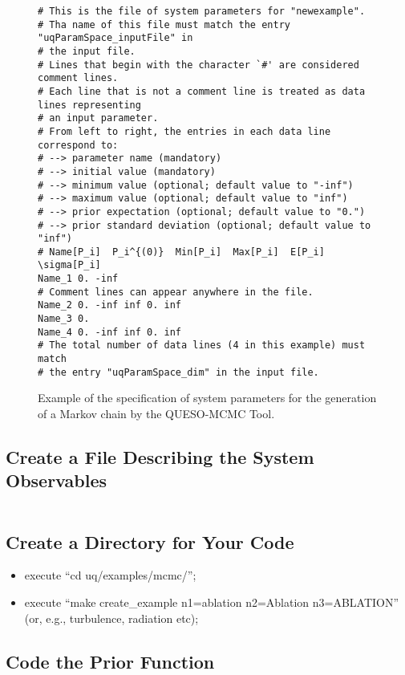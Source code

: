 \begin{figure}[h!]
\begin{verbatim}
# This is the file of system parameters for "newexample".
# Tha name of this file must match the entry "uqParamSpace_inputFile" in
# the input file.
# Lines that begin with the character `#' are considered comment lines.
# Each line that is not a comment line is treated as data lines representing
# an input parameter.
# From left to right, the entries in each data line correspond to:
# --> parameter name (mandatory)
# --> initial value (mandatory)
# --> minimum value (optional; default value to "-inf")
# --> maximum value (optional; default value to "inf")
# --> prior expectation (optional; default value to "0.")
# --> prior standard deviation (optional; default value to "inf")
# Name[P_i]  P_i^{(0)}  Min[P_i]  Max[P_i]  E[P_i]  \sigma[P_i]
Name_1 0. -inf
# Comment lines can appear anywhere in the file.
Name_2 0. -inf inf 0. inf
Name_3 0.
Name_4 0. -inf inf 0. inf
# The total number of data lines (4 in this example) must match
# the entry "uqParamSpace_dim" in the input file.
\end{verbatim}
\caption{Example of the specification of system parameters for the generation of a Markov chain by the QUESO-MCMC Tool.
}
\label{fig-dram-par-file-ex}
\end{figure}

\subsection{Create a File Describing the System Observables}\label{subsc-gmc-eight-steps-sys-output-quantities}
$~$\\

\subsection{Create a Directory for Your Code}\label{subsc-gmc-eight-steps-myexample}

\begin{itemize}
\item execute ``cd uq/examples/mcmc/'';
\item execute ``make create\_example n1=ablation n2=Ablation n3=ABLATION'' (or, e.g., turbulence, radiation etc);
\end{itemize}

\subsection{Code the Prior Function}\label{subsc-gmc-eight-steps-prior-code}

